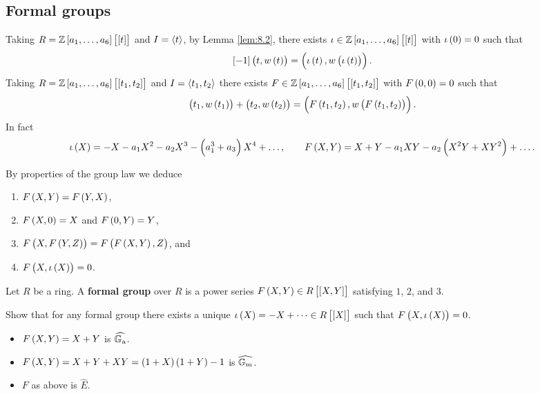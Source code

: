 \subsection{Formal groups}

Taking $ R = \ZZ\sbr{a_1, \dots, a_6}\sbr{\sbr{t}} $ and $ I = \left\langle t \right\rangle $, by Lemma \ref{lem:8.2}, there exists $ \iota \in \ZZ\sbr{a_1, \dots, a_6}\sbr{\sbr{t}} $ with $ \iota\br{0} = 0 $ such that
$$ \sbr{-1}\br{t, w\br{t}} = \br{\iota\br{t}, w\br{\iota\br{t}}}. $$
Taking $ R = \ZZ\sbr{a_1, \dots, a_6}\sbr{\sbr{t_1, t_2}} $ and $ I = \left\langle t_1, t_2 \right\rangle $ there exists $ F \in \ZZ\sbr{a_1, \dots, a_6}\sbr{\sbr{t_1, t_2}} $ with $ F\br{0, 0} = 0 $ such that
$$ \br{t_1, w\br{t_1}} + \br{t_2, w\br{t_2}} = \br{F\br{t_1, t_2}, w\br{F\br{t_1, t_2}}}. $$
In fact
$$ \iota\br{X} = -X - a_1X^2 - a_2X^3 - \br{a_1^3 + a_3}X^4 + \dots, \qquad F\br{X, Y} = X + Y - a_1XY - a_2\br{X^2Y + XY^2} + \dots. $$

\pagebreak

By properties of the group law we deduce
\begin{enumerate}
\item $ F\br{X, Y} = F\br{Y, X} $,
\item $ F\br{X, 0} = X $ and $ F\br{0, Y} = Y $,
\item $ F\br{X, F\br{Y, Z}} = F\br{F\br{X, Y}, Z} $, and
\item $ F\br{X, \iota\br{X}} = 0 $.
\end{enumerate}

\begin{definition*}
Let $ R $ be a ring. A \textbf{formal group} over $ R $ is a power series $ F\br{X, Y} \in R\sbr{\sbr{X, Y}} $ satisfying $ 1 $, $ 2 $, and $ 3 $.
\end{definition*}

\begin{exercise*}
Show that for any formal group there exists a unique $ \iota\br{X} = -X + \dots \in R\sbr{\sbr{X}} $ such that $ F\br{X, \iota\br{X}} = 0 $.
\end{exercise*}

\begin{example*}
\hfill
\begin{itemize}
\item $ F\br{X, Y} = X + Y $ is $ \widehat{\mathbb{G}_{\mathrm{a}}} $.
\item $ F\br{X, Y} = X + Y + XY = \br{1 + X}\br{1 + Y} - 1 $ is $ \widehat{\mathbb{G}_{\mathrm{m}}} $.
\item $ F $ as above is $ \widehat{E} $.
\end{itemize}
\end{example*}

